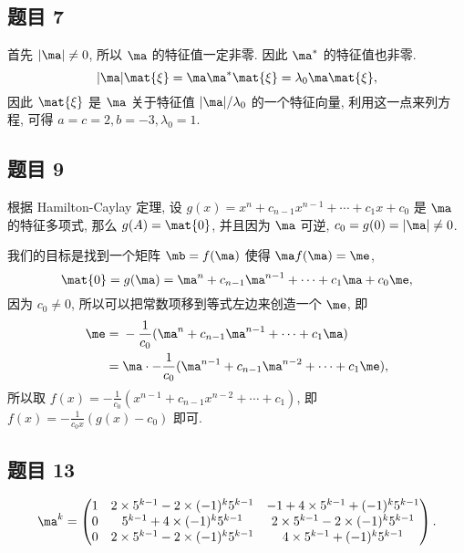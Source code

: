 \subsection*{ 题目 7 }
\begin{solution}
首先 $|\ma| \not= 0$, 所以 $\ma$ 的特征值一定非零. 因此 $\ma^\ast$ 的特征值也非零. 
\[
|\ma| \mat{\xi} = \ma \ma^\ast \mat{\xi} = \lambda_0 \ma \mat{\xi},
\]
因此 $\mat{\xi}$ 是 $\ma$ 关于特征值 $|\ma| / \lambda_0$ 的一个特征向量, 利用这一点来列方程, 可得 $a = c = 2, b = -3, \lambda_0 = 1$.
\end{solution}

\subsection*{ 题目 9 }
\begin{solution}
根据 Hamilton-Caylay 定理, 设 $g(x) = x^n + c_{n - 1} x^{n - 1} + \cdots + c_1 x + c_0$ 是 $\ma$ 的特征多项式, 那么 $g(A) = \mat{0}$, 并且因为 $\ma$ 可逆, $c_0 = g(0) = |\ma| \not= 0$. 

我们的目标是找到一个矩阵 $\mb = f(\ma)$ 使得 $\ma f (\ma) = \me$, 
\[
\mat{0} = g(\ma) = \ma^n + c_{n - 1}\ma^{n - 1} + \cdots + c_1 \ma + c_0 \me,
\]
因为 $c_0 \not= 0$, 所以可以把常数项移到等式左边来创造一个 $\me$, 即
\[
\begin{aligned}
    \me ={}& -\frac{1}{c_0}(\ma^n + c_{n - 1}\ma^{n - 1} + \cdots + c_1 \ma) \\
    ={}& \ma \cdot -\frac{1}{c_0}(\ma^{n - 1} + c_{n - 1}\ma^{n - 2} + \cdots + c_1 \me),
\end{aligned}
\]
所以取 $f(x) = -\frac{1}{c_0}(x^{n - 1} + c_{n - 1} x^{n - 2} + \cdots + c_1)$, 即 $f(x) = -\frac{1}{c_0x} (g(x) - c_0)$ 即可.
\end{solution}

\subsection*{ 题目 13 }
\begin{solution}
\[
\ma^k = \begin{pmatrix}
    1 & 2 \times 5 ^ {k - 1} - 2 \times (-1)^k 5^{k - 1} & -1 + 4 \times 5^{k - 1} + (-1)^k 5 ^{k - 1} \\
    0 & 5^{k - 1} + 4 \times (-1)^k 5^{k - 1} & 2 \times 5^{k - 1} - 2 \times (-1)^k 5^{k - 1} \\
    0 & 2 \times 5^{k - 1} - 2 \times (-1)^k 5^{k - 1} & 4 \times 5^{k - 1} + (-1)^k 5^{k - 1}
\end{pmatrix}.
\]
\end{solution}

